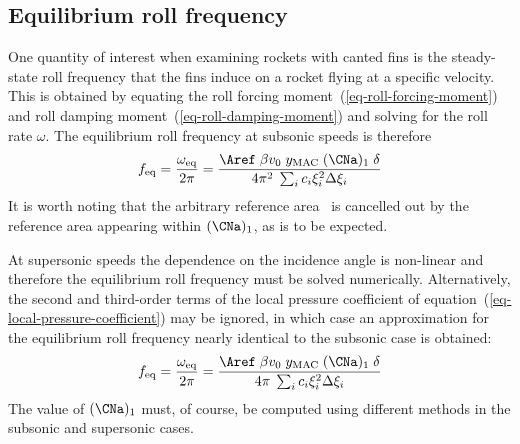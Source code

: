 \subsection{Equilibrium roll frequency}

One quantity of interest when examining rockets with canted fins
is the steady-state roll frequency that the fins induce on a rocket
flying at a specific velocity.  This is obtained by equating the roll
forcing moment~(\ref{eq-roll-forcing-moment}) and roll damping
moment~(\ref{eq-roll-damping-moment}) and solving for the roll rate
$\omega$.  The equilibrium roll frequency at subsonic speeds is
therefore
%
\begin{equation}
f_{\rm eq} = \frac{\omega_{\rm eq}}{2\pi} =
\frac{\Aref\; \beta v_0 \; y_{\rm MAC} \; (\CNa)_1 \; \delta}
{4\pi^2\; \sum_i c_i\xi_i^2\Delta\xi_i}
\label{eq-subsonic-roll-rate}
\end{equation}
%
It is worth noting that the arbitrary reference area \Aref\ is
cancelled out by the reference area appearing within $(\CNa)_1$,
as is to be expected.

At supersonic speeds the dependence on the incidence angle is
non-linear and therefore the equilibrium roll frequency must be solved
numerically.  Alternatively, the second and third-order terms of the
local pressure coefficient of
equation~(\ref{eq-local-pressure-coefficient}) may be ignored, in
which case an approximation for the equilibrium roll frequency nearly
identical to the subsonic case is obtained:
%
\begin{equation}
f_{\rm eq} = \frac{\omega_{\rm eq}}{2\pi} =
\frac{\Aref\; \beta v_0 \; y_{\rm MAC} \; (\CNa)_1 \; \delta}
{4\pi\; \sum_i c_i\xi_i^2\Delta\xi_i}
\label{eq-supersonic-roll-rate}
\end{equation}
%
The value of $(\CNa)_1$ must, of course, be computed using different
methods in the subsonic and supersonic cases.




